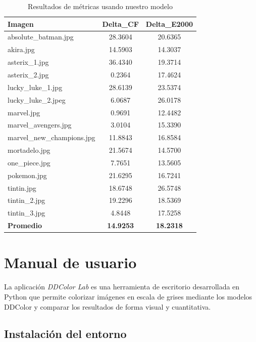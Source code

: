 \documentclass[a4paper]{article}
\begin{document}
\begin{table}[ht]
	\centering
	\begin{tabular}{lcc}
		\hline
		\textbf{Imagen} & \textbf{Delta\_CF} & \textbf{Delta\_E2000} \\
		\hline
		absolute\_batman.jpg      & 28.3604 & 20.6365 \\
		akira.jpg                 & 14.5903 & 14.3037 \\
		asterix\_1.jpg            & 36.4340 & 19.3714 \\
		asterix\_2.jpg            & 0.2364  & 17.4624 \\
		lucky\_luke\_1.jpg        & 28.6139 & 23.5374 \\
		lucky\_luke\_2.jpeg       & 6.0687  & 26.0178 \\
		marvel.jpg                & 0.9691  & 12.4482 \\
		marvel\_avengers.jpg      & 3.0104  & 15.3390 \\
		marvel\_new\_champions.jpg & 11.8843 & 16.8584 \\
		mortadelo.jpg             & 21.5674 & 14.5700 \\
		one\_piece.jpg            & 7.7651  & 13.5605 \\
		pokemon.jpg               & 21.6295 & 16.7241 \\
		tintin.jpg                & 18.6748 & 26.5748 \\
		tintin\_2.jpg             & 19.2296 & 18.5369 \\
		tintin\_3.jpg             & 4.8448  & 17.5258 \\
		\hline
		\textbf{Promedio} & \textbf{14.9253} & \textbf{18.2318} \\
		\hline
	\end{tabular}
	\caption{Resultados de métricas usando nuestro modelo}
	\label{tab:resultados_comic}
\end{table}

\clearpage

\section{Manual de usuario}

La aplicación \textit{DDColor Lab} es una herramienta de escritorio desarrollada en Python que permite colorizar imágenes en escala de grises mediante los modelos DDColor y comparar los resultados de forma visual y cuantitativa.

\subsection{Instalación del entorno}
\end{document}
